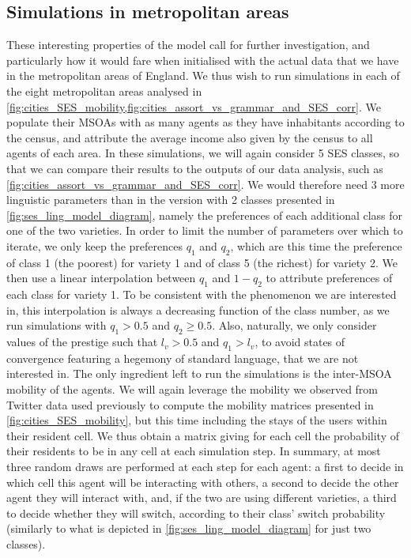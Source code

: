 \documentclass[../thesis.tex]{subfiles}
\begin{document}
\subsection{Simulations in metropolitan areas}
These interesting properties of the model call for further investigation, and particularly how it would fare when initialised with the actual data that we have in the metropolitan areas of England.
We thus wish to run simulations in each of the eight metropolitan areas analysed in \cref{fig:cities_SES_mobility,fig:cities_assort_vs_grammar_and_SES_corr}.
We populate their \acp{MSOA} with as many agents as they have inhabitants according to the census, and attribute the average income also given by the census to all agents of each area.
In these simulations, we will again consider 5 \ac{SES} classes, so that we can compare their results to the outputs of our data analysis, such as \cref{fig:cities_assort_vs_grammar_and_SES_corr}.
We would therefore need 3 more linguistic parameters than in the version with 2 classes presented in \cref{fig:ses_ling_model_diagram}, namely the preferences of each additional class for one of the two varieties.
In order to limit the number of parameters over which to iterate, we only keep the preferences $q_1$ and $q_2$, which are this time the preference of class 1 (the poorest) for variety 1 and of class 5 (the richest) for variety 2.
We then use a linear interpolation between $q_1$ and $1 - q_2$ to attribute preferences of each class for variety 1.
To be consistent with the phenomenon we are interested in, this interpolation is always a decreasing function of the class number, as we run simulations with $q_1 > 0.5$ and $q_2 \geq 0.5$.
Also, naturally, we only consider values of the prestige such that $l_v > 0.5$ and $q_1 > l_v$, to avoid states of convergence featuring a hegemony of standard language, that we are not interested in.
The only ingredient left to run the simulations is the inter-\ac{MSOA} mobility of the agents.
We will again leverage the mobility we observed from Twitter data used previously to compute the mobility matrices presented in \cref{fig:cities_SES_mobility}, but this time including the stays of the users within their resident cell.
We thus obtain a matrix giving for each cell the probability of their residents to be in any cell at each simulation step.
In summary, at most three random draws are performed at each step for each agent: a first to decide in which cell this agent will be interacting with others, a second to decide the other agent they will interact with, and, if the two are using different varieties, a third to decide whether they will switch, according to their class' switch probability (similarly to what is depicted in \cref{fig:ses_ling_model_diagram} for just two classes).
\end{document}
